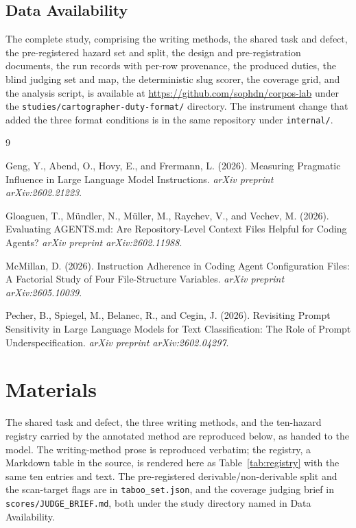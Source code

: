 \documentclass[11pt,a4paper]{article}
\begin{document}
\subsection{Data Availability}

The complete study, comprising the writing methods, the shared task and defect, the
pre-registered hazard set and split, the design and pre-registration documents,
the run records with per-row provenance, the produced duties, the blind judging
set and map, the deterministic slug scorer, the coverage grid, and the analysis
script, is available at \url{https://github.com/sophdn/corpos-lab} under the
\texttt{studies/cartographer-duty-format/} directory. The instrument change that
added the three format conditions is in the same repository under
\texttt{internal/}.



\begin{thebibliography}{9}

Geng, Y., Abend, O., Hovy, E., and Frermann, L. (2026).
\newblock Measuring Pragmatic Influence in Large Language Model Instructions.
\newblock \emph{arXiv preprint arXiv:2602.21223}.

Gloaguen, T., Mündler, N., Müller, M., Raychev, V., and Vechev, M. (2026).
\newblock Evaluating AGENTS.md: Are Repository-Level Context Files Helpful for Coding
  Agents?
\newblock \emph{arXiv preprint arXiv:2602.11988}.

McMillan, D. (2026).
\newblock Instruction Adherence in Coding Agent Configuration Files: A Factorial Study of
  Four File-Structure Variables.
\newblock \emph{arXiv preprint arXiv:2605.10039}.

Pecher, B., Spiegel, M., Belanec, R., and Cegin, J. (2026).
\newblock Revisiting Prompt Sensitivity in Large Language Models for Text Classification:
  The Role of Prompt Underspecification.
\newblock \emph{arXiv preprint arXiv:2602.04297}.

\end{thebibliography}

\appendix
\section{Materials}\label{app:materials}

The shared task and defect, the three writing methods, and the ten-hazard
registry carried by the annotated method are reproduced below, as handed to the
model. The writing-method prose is reproduced verbatim; the registry, a Markdown
table in the source, is rendered here as Table~\ref{tab:registry} with the same
ten entries and text. The pre-registered derivable/non-derivable split and the
scan-target flags are in \texttt{taboo\_set.json}, and the coverage judging brief
in \texttt{scores/JUDGE\_BRIEF.md}, both under the study directory named in Data
Availability.
\end{document}
